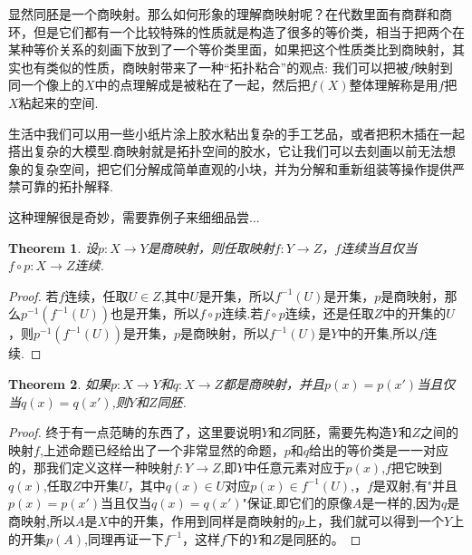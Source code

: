 \documentclass{article}
\newtheorem{theorem}{Theorem}[section]
\newcommand*{\xfunc}[4]{{#2}\colon{#3}{#1}{#4}}
\newcommand*{\func}[3]{\xfunc{\to}{#1}{#2}{#3}}
\begin{document}
显然同胚是一个商映射。那么如何形象的理解商映射呢？在代数里面有商群和商环，但是它们都有一个比较特殊的性质就是构造了很多的等价类，相当于把两个在某种等价关系的刻画下放到了一个等价类里面，如果把这个性质类比到商映射，其实也有类似的性质，商映射带来了一种“拓扑粘合”的观点: 我们可以把被$f$映射到同一个像上的$X$中的点理解成是被粘在了一起，然后把$f(X)$整体理解称是用$f$把$X$粘起来的空间.

生活中我们可以用一些小纸片涂上胶水粘出复杂的手工艺品，或者把积木插在一起搭出复杂的大模型.商映射就是拓扑空间的胶水，它让我们可以去刻画以前无法想象的复杂空间，把它们分解成简单直观的小块，并为分解和重新组装等操作提供严禁可靠的拓扑解释.

这种理解很是奇妙，需要靠例子来细细品尝...

\begin{theorem}
设$\func{p}{X}{Y}$是商映射，则任取映射$\func{f}{Y}{Z}$，$f$连续当且仅当$\func{f \circ p}{X}{Z}$连续.
\end{theorem}

\begin{proof}
若$f$连续，任取$U \in Z$,其中$U$是开集，所以$f^{-1}(U)$是开集，$p$是商映射，那么$p^{-1}(f^{-1}(U))$也是开集，所以$f \circ p$连续.若$f \circ p$连续，还是任取$Z$中的开集的$U$，则$p^{-1}(f^{-1}(U))$是开集，$p$是商映射，所以$f^{-1}(U)$是$Y$中的开集,所以$f$连续.
\end{proof}

\begin{theorem}
如果$\func{p}{X}{Y}$和$\func{q}{X}{Z}$都是商映射，并且$p(x)=p(x')$当且仅当$q(x)=q(x')$,则$Y$和$Z$同胚.
\begin{center}
\end{center}
\end{theorem}

\begin{proof}
终于有一点范畴的东西了，这里要说明$Y$和$Z$同胚，需要先构造$Y$和$Z$之间的映射$f$,上述命题已经给出了一个非常显然的命题，$p$和$q$给出的等价类是一一对应的，那我们定义这样一种映射$\func{f}{Y}{Z}$,即$Y$中任意元素对应于$p(x)$,$f$把它映到$q(x)$,任取$Z$中开集$U$，其中$q(x) \in U$对应$p(x) \in f^{-1}(U)$,，$f$是双射,有"并且$p(x)=p(x')$当且仅当$q(x)=q(x')$"保证,即它们的原像$A$是一样的,因为$q$是商映射,所以$A$是$X$中的开集，作用到同样是商映射的$p$上，我们就可以得到一个$Y$上的开集$p(A)$,同理再证一下$f^{-1}$，这样$f$下的$Y$和$Z$是同胚的。
\end{proof}
\end{document}

